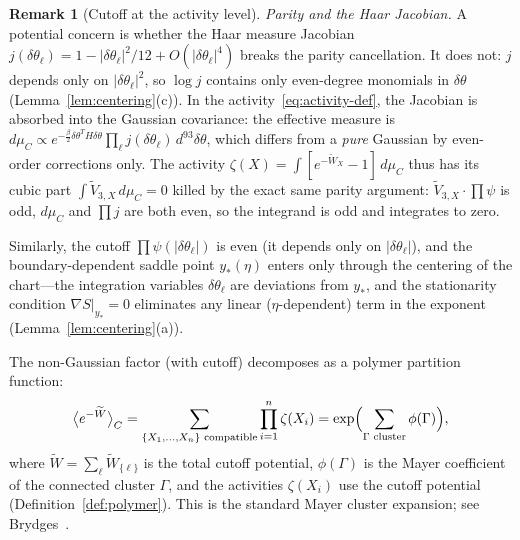 \documentclass[11pt]{article}
\theoremstyle{definition}
\newtheorem{remark}[theorem]{Remark}
\begin{document}
\begin{remark}[Cutoff at the activity level]
\emph{Parity and the Haar Jacobian.}
A potential concern is whether the Haar measure Jacobian
$j(\delta\theta_\ell)=1-|\delta\theta_\ell|^2/12+O(|\delta\theta_\ell|^4)$
breaks the parity cancellation.  It does not: $j$ depends only on
$|\delta\theta_\ell|^2$, so $\log j$ contains only even-degree
monomials in $\delta\theta$ (Lemma~\ref{lem:centering}(c)).  In the
activity~\eqref{eq:activity-def}, the Jacobian is absorbed into the
Gaussian covariance: the effective measure is $d\mu_C\propto
e^{-\frac{\beta}{2}\delta\theta^T H\delta\theta}\prod_\ell
j(\delta\theta_\ell)\,d^{93}\delta\theta$, which differs from a
\emph{pure} Gaussian by even-order corrections only.
The activity $\zeta(X)=\int[e^{-\widetilde{W}_X}-1]\,d\mu_C$ thus
has its cubic part $\int\widetilde{V}_{3,X}\,d\mu_C=0$ killed by the
exact same parity argument: $\widetilde{V}_{3,X}\cdot\prod\psi$ is
odd, $d\mu_C$ and $\prod j$ are both even, so the integrand is odd
and integrates to zero.

Similarly, the cutoff $\prod\psi(|\delta\theta_\ell|)$ is even
(it depends only on $|\delta\theta_\ell|$), and the boundary-dependent
saddle point $y_*(\eta)$ enters only through the centering of the
chart---the integration variables $\delta\theta_\ell$ are deviations
from $y_*$, and the stationarity condition $\nabla S|_{y_*}=0$
eliminates any linear ($\eta$-dependent) term in the exponent
(Lemma~\ref{lem:centering}(a)).
\end{remark}

The non-Gaussian factor (with cutoff) decomposes as a polymer
partition function:
\begin{equation}\label{eq:polymer-Z}
\bigl\langle e^{-\widetilde{W}}\bigr\rangle_C
=\sum_{\{X_1,\ldots,X_n\}\text{ compatible}}
\prod_{i=1}^n\zeta(X_i)
=\exp\Bigl(\sum_{\Gamma\text{ cluster}}\phi(\Gamma)\Bigr),
\end{equation}
where $\widetilde{W}=\sum_\ell\widetilde{W}_{\{\ell\}}$ is the total
cutoff potential, $\phi(\Gamma)$ is the Mayer coefficient of the
connected cluster $\Gamma$, and the activities $\zeta(X_i)$ use
the cutoff potential (Definition~\ref{def:polymer}).  This is the
standard Mayer cluster expansion; see Brydges~\cite{Brydges86}.
\end{document}
